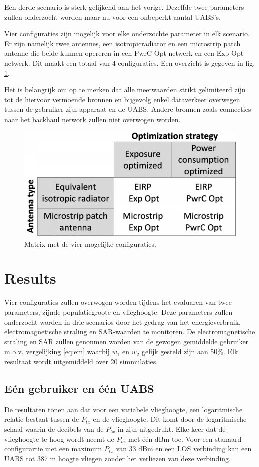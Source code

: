 \documentclass[twocolumn]{phdsymp_dutch}
\begin{document}
Een derde scenario is sterk gelijkend aan het vorige. Dezelfde twee parameters zullen onderzocht 
worden maar nu voor een onbeperkt aantal \gls{UABS}'s.

Vier configuraties zijn mogelijk voor elke onderzochte parameter in elk scenario.
Er zijn namelijk twee antennes, een \gls{isotropicradiator} en een microstrip patch antenne die
beide kunnen opereren in een \gls{PwrC Opt} netwerk en een \gls{Exp Opt} netwerk. Dit maakt een totaal van 4 configuraties.
Een overzicht is gegeven in fig. \ref{fig:fourCasesMatrix}.

Het is belangrijk om op te merken dat alle meetwaarden strikt gelimiteerd zijn tot de hiervoor vermoende bronnen en 
bijgevolg enkel dataverkeer overwegen tussen de gebruiker zijn apparaat en de \gls{UABS}. 
Andere bronnen zoals connecties naar het backhaul network zullen niet overwogen worden.

\begin{figure}[h!]
\centering
  \includegraphics[width=0.6\linewidth]{fourCasesMatrix.png}
  \caption{Matrix met de vier mogelijke configuraties.}
  \label{fig:fourCasesMatrix}
\end{figure}

\section{Results}
Vier configuraties zullen overwogen worden tijdens het evaluaren van twee parameters, zijnde 
populatiegroote en vlieghoogte. Deze parameters zullen onderzocht worden in drie scenarios 
door het gedrag van het energieverbruik, electromagnetische straling en \gls{SAR}-waarden te monitoren.
De electromagnetische straling en \gls{SAR} zullen genonmen worden van de gewogen gemiddelde gebruiker
m.b.v. vergelijking \ref{eq:em} waarbij $w_{1}$ en $w_{2}$ gelijk gesteld zijn aan 50\%. 
Elk resultaat wordt uitgemiddeld over 20 simmulaties.


\subsection{E\'en gebruiker en \'e\'en \gls{UABS}}
De resultaten tonen aan dat voor een variabele vlieghoogte, een logaritmische relatie bestaat tussen de 
 $P_{tx}$ en de vlieghoogte.
 Dit komt door de logaritmische schaal waarin de decibels van de $P_{tx}$ in zijn uitgedrukt.
Elke keer dat de vlieghoogte te hoog wordt neemt de $P_{tx}$ met \'e\'en dBm toe.
Voor een stanaard configurartie met een maximum $P_{tx}$ van 33 dBm en een \gls{LOS} verbinding kan een 
\gls{UABS} tot 387 m hoogte vliegen zonder het verliezen van deze verbinding.
\end{document}
